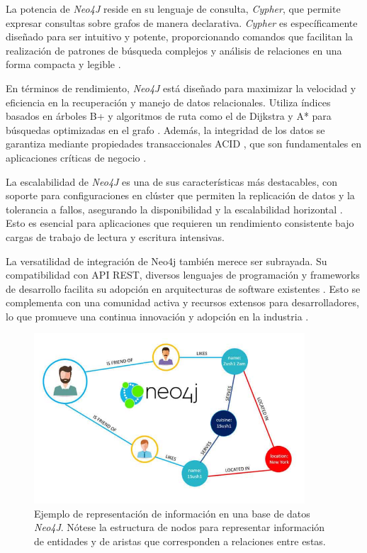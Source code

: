 La potencia de \textit{Neo4J} reside en su lenguaje de consulta, \textit{Cypher}, que permite expresar consultas sobre grafos de manera declarativa. \textit{Cypher} es específicamente diseñado para ser intuitivo y potente, proporcionando comandos que facilitan la realización de patrones de búsqueda complejos y análisis de relaciones en una forma compacta y legible \cite{neo4jdocs2022}.

En términos de rendimiento,  \textit{Neo4J} está diseñado para maximizar la velocidad y eficiencia en la recuperación y manejo de datos relacionales. Utiliza índices basados en árboles B+ y algoritmos de ruta como el de Dijkstra y A* para búsquedas optimizadas en el grafo \cite{nagarajan2017}. Además, la integridad de los datos se garantiza mediante propiedades transaccionales ACID \cite{acidtransactions}, que son fundamentales en aplicaciones críticas de negocio \cite{vukoticabedrabboandpartner2014}.

La escalabilidad de  \textit{Neo4J} es una de sus características más destacables, con soporte para configuraciones en clúster que permiten la replicación de datos y la tolerancia a fallos, asegurando la disponibilidad y la escalabilidad horizontal \cite{hunter2017}. Esto es esencial para aplicaciones que requieren un rendimiento consistente bajo cargas de trabajo de lectura y escritura intensivas.

La versatilidad de integración de Neo4j también merece ser subrayada. Su compatibilidad con API REST, diversos lenguajes de programación y frameworks de desarrollo facilita su adopción en arquitecturas de software existentes \cite{neo4jdocs2022}. Esto se complementa con una comunidad activa y recursos extensos para desarrolladores, lo que promueve una continua innovación y adopción en la industria \cite{partnerandfaircloth2019}.

\begin{figure}[H]\label{neo4jdb}
	\centering
	\includegraphics[width = 0.9\textwidth]{./Graphics/neo4j}
	\caption{Ejemplo de representación de información en una base de datos \textit{Neo4J}. Nótese la estructura de nodos para representar información de entidades y de aristas que corresponden a relaciones entre estas.}
\end{figure} 

